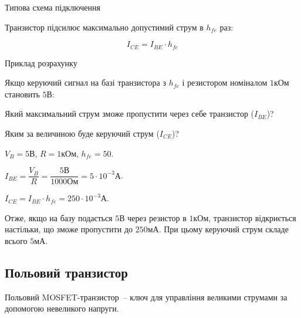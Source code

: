 \documentclass[12pt,a4paper]{report}  %
\begin{document}
Типова схема підключення

Транзистор підсилює максимально допустимий струм в $h_{fe}$ раз:

$$ I_{CE} = I_{BE} \cdot h_{fe} $$

Приклад розрахунку

Якщо керуючий сигнал на базі транзистора з $h_{fe}$ і резистором номіналом $1 \text{кОм}$ становить $5 \text{В}$:

Який максимальний струм зможе пропустити через себе транзистор ($I_{BE}$)?

Яким за величиною буде керуючий струм ($I_{CE}$)?

$V_B = 5\text{В}$,
$R = 1\text{кОм}$,
$h_{fe} = 50$.


$ I_{BE} = \dfrac{V_B}{R} = \dfrac{5\text{В}}{1000\text{Ом}} = 5 \cdot 10^{-3} \text{А} $.

$I_{CE} = I_{BE} \cdot h_{fe} = 250 \cdot 10^{-3} \text{А}$.

Отже, якщо на базу подається $5\text{В}$ через резистор в $1\text{кОм}$, транзистор відкриється настільки, що зможе пропустити до $250\text{мА}$. При цьому керуючий струм складе всього $5\text{мА}$.

\subsection{Польовий транзистор}

Польовий MOSFET-транзистор~-- ключ для управління великими струмами за допомогою невеликого напруги.

\begin{figure}[h!]
\label{ris:image}
\end{figure}

\end{document}
